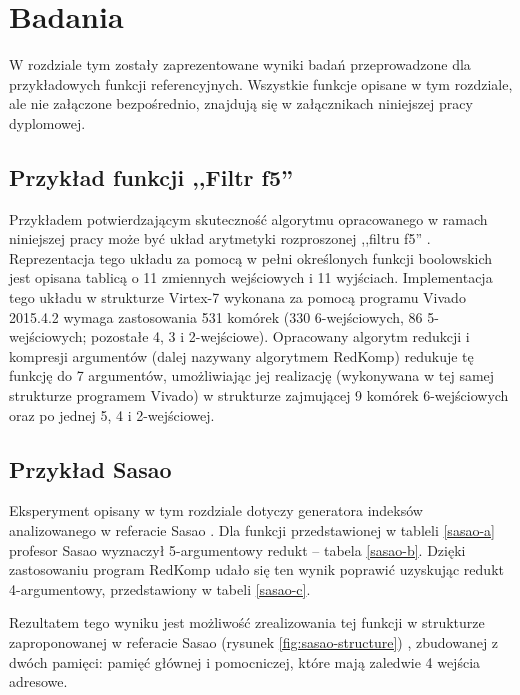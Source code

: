 \chapter{Badania}
\label{chapter:research}

W rozdziale tym zostały zaprezentowane wyniki badań przeprowadzone dla przykładowych funkcji referencyjnych.
Wszystkie funkcje opisane w tym rozdziale,
ale nie załączone bezpośrednio,
znajdują się w załącznikach niniejszej pracy dyplomowej.

\section{Przykład funkcji ,,Filtr f5''}

Przykładem potwierdzającym skuteczność algorytmu opracowanego w ramach niniejszej pracy
może być układ arytmetyki rozproszonej \cite{memory-capacity} ,,filtru f5'' \cite{nine-filters}.
Reprezentacja tego układu za pomocą w pełni określonych funkcji boolowskich
jest opisana tablicą o 11 zmiennych wejściowych i 11 wyjściach.
Implementacja tego układu \cite{redukcja-kompresja} w strukturze Virtex-7 wykonana za pomocą programu Vivado 2015.4.2
wymaga zastosowania 531 komórek (330 6-wejściowych, 86 5-wejściowych; pozostałe 4, 3 i 2-wejściowe).
Opracowany algorytm redukcji i kompresji argumentów (dalej nazywany algorytmem RedKomp)
redukuje tę funkcję do 7 argumentów,
umożliwiając jej realizację
(wykonywana w tej samej strukturze programem Vivado)
w strukturze zajmującej 9 komórek 6-wejściowych oraz po jednej 5, 4 i 2-wejściowej.

\section{Przykład Sasao}

Eksperyment opisany w tym rozdziale dotyczy generatora indeksów analizowanego w referacie Sasao \cite{sasao-workshop}.
Dla funkcji przedstawionej w tableli \ref{sasao-a} profesor Sasao wyznaczył 5-argumentowy redukt – tabela \ref{sasao-b}.
Dzięki zastosowaniu program RedKomp udało się ten wynik poprawić uzyskując redukt 4-argumentowy,
przedstawiony w tabeli \ref{sasao-c}.



Rezultatem tego wyniku jest możliwość zrealizowania tej funkcji w strukturze zaproponowanej w referacie Sasao (rysunek \ref{fig:sasao-structure}) \cite{sasao-workshop},
zbudowanej z dwóch pamięci: pamięć głównej i pomocniczej,
które mają zaledwie 4 wejścia adresowe.

